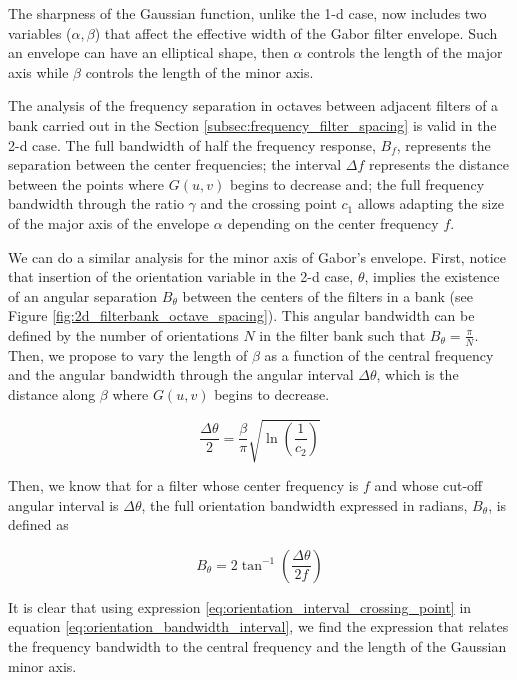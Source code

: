 The sharpness of the Gaussian function, unlike the 1-d case, now includes two variables ($\alpha, \beta$) that affect the effective width of the Gabor filter envelope. Such an envelope can have an elliptical shape, then $\alpha $ controls the length of the major axis while $\beta$ controls the length of the minor axis. 

The analysis of the frequency separation in octaves between adjacent filters of a bank carried out in the Section \ref{subsec:frequency_filter_spacing} is valid in the 2-d case. The full bandwidth of half the frequency response, $B_f$, represents the separation between the center frequencies; the interval $\Delta f$ represents the distance between the points where $G(u, v)$ begins to decrease and; the full frequency bandwidth through the ratio $\gamma$ and the crossing point $c_1$ allows adapting the size of the major axis of the envelope $\alpha$ depending on the center frequency $f$.

We can do a similar analysis for the minor axis of Gabor's envelope. First, notice that insertion of the orientation variable in the 2-d case, $\theta$, implies the existence of an angular separation $B_{\theta}$ between the centers of the filters in a bank (see Figure \ref{fig:2d_filterbank_octave_spacing}). This angular bandwidth can be defined by the number of orientations $N$ in the filter bank such that $B_{\theta} = \frac{\pi}{N}$. Then, we propose to vary the length of $\beta$ as a function of the central frequency and the angular bandwidth through the angular interval $\Delta \theta$, which is the distance along $\beta$ where $G(u, v)$ begins to decrease.

\begin{equation}\label{eq:orientation_interval_crossing_point}
    \frac{\Delta \theta}{2} = \frac{\beta}{\pi}\sqrt{\ln \left(\frac{1}{c_2}\right)}
\end{equation}

Then, we know that for a filter whose center frequency is $f$ and whose cut-off angular interval is $\Delta \theta$, the full orientation bandwidth expressed in radians, $B_\theta$, is defined as \cite{Daugman:JOSA:1985a}

\begin{equation}\label{eq:orientation_bandwidth_interval}
    B_{\theta} = 2 \tan^{-1} \left( \frac{\Delta \theta}{2f} \right)
\end{equation}

It is clear that using expression \eqref{eq:orientation_interval_crossing_point} in equation \eqref{eq:orientation_bandwidth_interval}, we find the expression that relates the frequency bandwidth to the central frequency and the length of the Gaussian minor axis.

